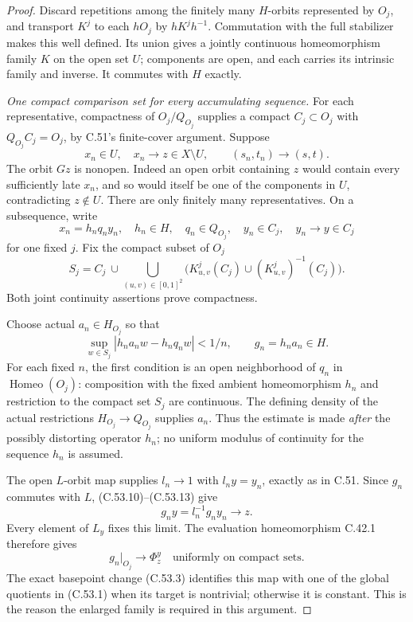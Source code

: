 \begin{proof}
Discard repetitions among the finitely many
$H$-orbits represented by $O_j$, and transport
$K^j$ to each $hO_j$ by $hK^jh^{-1}$.
Commutation with the full stabilizer makes this
well defined. Its union gives a jointly continuous
homeomorphism family $K$ on the open set $U$;
components are open, and each carries its intrinsic
family and inverse. It commutes with $H$ exactly.

\emph{One compact comparison set for every accumulating sequence.}
For each representative, compactness of
$O_j/Q_{O_j}$ supplies a compact $C_j\subset O_j$
with $Q_{O_j}C_j=O_j$, by C.51's finite-cover
argument. Suppose
\[
 x_n\in U,\quad x_n\longrightarrow z\in X\setminus U,
                  \qquad(s_n,t_n)\longrightarrow(s,t).
                                                        \tag{C.53.10}
\]
The orbit $Gz$ is nonopen. Indeed an open orbit
containing $z$ would contain every sufficiently
late $x_n$, and so would itself be one of the
components in $U$, contradicting $z\notin U$.
There are only finitely many representatives.
On a subsequence, write
\[
                  x_n=h_nq_ny_n,
 \quad h_n\in H,\quad q_n\in Q_{O_j},\quad
                  y_n\in C_j,\quad y_n\longrightarrow y\in C_j
                                                        \tag{C.53.11}
\]
for one fixed $j$. Fix the compact subset of $O_j$
\[
 S_j=C_j\ \cup\!
       \bigcup_{(u,v)\in[0,1]^2}
       \bigl(K^j_{u,v}(C_j)\cup(K^j_{u,v})^{-1}(C_j)\bigr).
                                                        \tag{C.53.12}
\]
Both joint continuity assertions prove compactness.

Choose actual $a_n\in H_{O_j}$ so that
\[
 \sup_{w\in S_j}
          |h_na_nw-h_nq_nw|<1/n,
 \qquad g_n=h_na_n\in H.
                                                        \tag{C.53.13}
\]
For each fixed $n$, the first condition is an
open neighborhood of $q_n$ in
$\operatorname{Homeo}(O_j)$: composition with the
fixed ambient homeomorphism $h_n$ and restriction
to the compact set $S_j$ are continuous.
The defining density of the actual restrictions
$H_{O_j}\to Q_{O_j}$ supplies $a_n$.
Thus the estimate is made \emph{after} the possibly
distorting operator $h_n$; no uniform modulus of
continuity for the sequence $h_n$ is assumed.

The open $L$-orbit map supplies $l_n\to1$ with
$l_ny=y_n$, exactly as in C.51. Since $g_n$
commutes with $L$, (C.53.10)--(C.53.13) give
\[
                       g_ny=l_n^{-1}g_ny_n\longrightarrow z.
                                                        \tag{C.53.14}
\]
Every element of $L_y$ fixes this limit.
The evaluation homeomorphism C.42.1 therefore gives
\[
                g_n|_{O_j}\longrightarrow\Phi_z^y
                     \quad\text{uniformly on compact sets}.
                                                        \tag{C.53.15}
\]
The exact basepoint change (C.53.3) identifies this
map with one of the global quotients in (C.53.1)
when its target is nontrivial; otherwise it is
constant. This is the reason the enlarged family
is required in this argument.


\end{proof}
